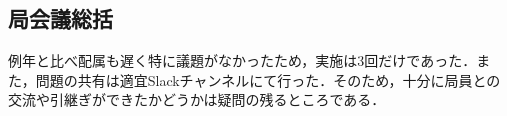\subsection*{局会議総括}


例年と比べ配属も遅く特に議題がなかったため，実施は3回だけであった．また，問題の共有は適宜Slackチャンネルにて行った．そのため，十分に局員との交流や引継ぎができたかどうかは疑問の残るところである．
